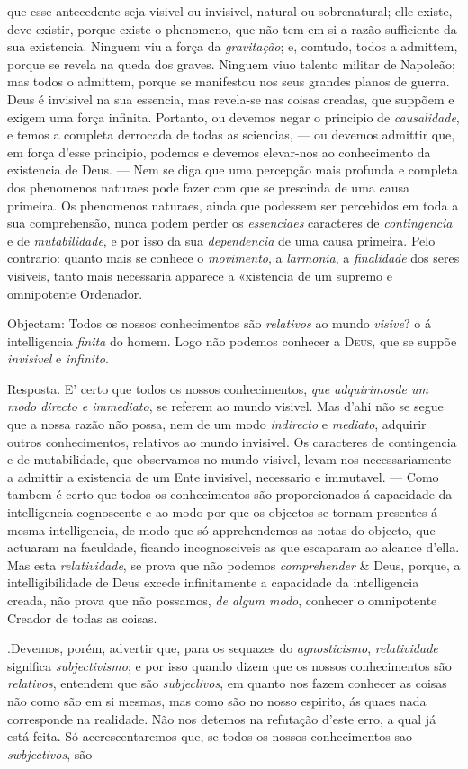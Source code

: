que esse antecedente seja visivel ou invisivel, natural ou sobrenatural; elle existe, deve existir, porque existe o phenomeno, que não tem em si a razão sufficiente da sua existencia. Ninguem viu a força da \emph{gravitação}; e, comtudo, todos a admittem, porque se revela na queda dos graves. Ninguem viuo talento militar de Napoleão; mas todos o admittem, porque se manifestou nos seus grandes planos de guerra. Deus é invisivel na sua essencia, mas revela-se nas coisas creadas, que suppõem e exigem uma força infinita. Portanto, ou devemos negar o principio de \emph{causalidade}, e temos a completa derrocada de todas as sciencias, --- ou devemos admittir que, em força d'esse principio, podemos e devemos elevar-nos ao conhecimento da existencia de Deus. --- Nem se diga que uma percepção mais profunda e completa dos phenomenos naturaes pode fazer com que se prescinda de uma causa primeira. Os phenomenos naturaes, ainda que podessem ser percebidos em toda a sua comprehensão, nunca podem perder os \emph{essenciaes} caracteres de \emph{contingencia} e de \emph{mutabilidade}, e por isso da sua \emph{dependencia} de uma causa primeira. Pelo contrario: quanto mais se conhece o \emph{movimento}, a \emph{larmonia}, a \emph{finalidade} dos seres visiveis, tanto mais necessaria apparece a «xistencia de um supremo e omnipotente Ordenador.\par Objectam: Todos os nossos conhecimentos são \emph{relativos} ao mundo \emph{visive}? o á intelligencia \emph{finita} do homem. Logo não podemos conhecer a \textsc{Deus}, que se suppõe \emph{invisivel} e \emph{infinito}.\par Resposta. E' certo que todos os nossos conhecimentos, \emph{que adquirimos}\emph{de um modo directo e immediato}, se referem ao mundo visivel. Mas d'ahi não se segue que a nossa razão não possa, nem de um modo \emph{indirecto} e \emph{mediato}, adquirir outros conhecimentos, relativos ao mundo invisivel. Os caracteres de contingencia e de mutabilidade, que observamos no mundo visivel, levam-nos necessariamente a admittir a existencia de um Ente invisivel, necessario e immutavel. --- Como tambem é certo que todos os conhecimentos são proporcionados á capacidade da intelligencia cognoscente e ao modo por que os objectos se tornam presentes á mesma intelligencia, de modo que só apprehendemos as notas do objecto, que actuaram na faculdade, ficando incognosciveis as que escaparam ao alcance d'ella. Mas esta \emph{relatividade}, se prova que não podemos \emph{comprehender} \& Deus, porque, a intelligibilidade de Deus excede infinitamente a capacidade da intelligencia creada, não prova que não possamos, \emph{de algum modo}, conhecer o omnipotente Creador de todas as coisas.\par .Devemos, porém, advertir que, para os sequazes do \emph{agnosticismo}, \emph{relatividade} significa \emph{subjectivismo}; e por isso quando dizem que os nossos conhecimentos são \emph{relativos}, entendem que são \emph{subjeclivos}, em quanto nos fazem conhecer as coisas não como são em si mesmas, mas como são no nosso espirito, ás quaes nada corresponde na realidade. Não nos detemos na refutação d'este erro, a qual já está feita. Só acerescentaremos que, se todos os nossos conhecimentos sao \emph{swbjectivos}, são 